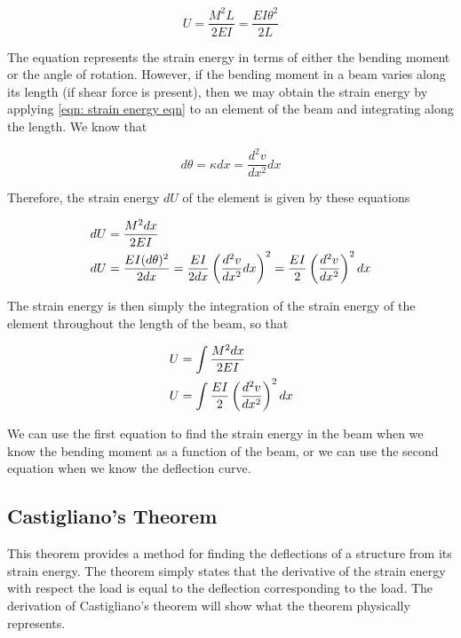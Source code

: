 \documentclass[
10pt,
a4paper,
openany,
svgnames,
]{kaobook} %
\begin{document}
\begin{equation} \label{eqn: strain energy eqn}
  U = \frac{M^2L}{2EI} = \frac{EI\theta ^2}{2L}
\end{equation}

The equation represents the strain energy in terms of either the bending moment or the angle of rotation. However, if the bending moment in a beam varies along its length (if shear force is present), then we may obtain the strain energy by applying \cref{eqn: strain energy eqn} to an element of the beam and integrating along the length. We know that

\[d\theta  = \kappa dx = \frac{{{d^2}v}}{{d{x^2}}}dx\]

Therefore, the strain energy $dU$ of the element is given by these equations

\[\begin{gathered}
  dU = \frac{M^2dx}{2EI} \hfill \\
  dU = \frac{EI(d\theta )^2}{2dx} = \frac{EI}{2dx}\left( \frac{d^2v}{dx^2}dx \right)^2 = \frac{EI}{2}\left( \frac{d^2v}{dx^2} \right)^2dx \hfill \\ 
\end{gathered} \]

The strain energy is then simply the integration of the strain energy of the element throughout the length of the beam, so that

\begin{equation}
  \begin{gathered}
    U = \int \frac{M^2dx}{2EI}  \hfill \\
    U = \int \frac{EI}{2} \left( \frac{d^2v}{dx^2} \right)^2dx  \hfill \\ 
  \end{gathered}
\end{equation}

We can use the first equation to find the strain energy in the beam when we know the bending moment as a function of the beam, or we can use the second equation when we know the deflection curve.

\subsection{Castigliano’s Theorem}

This theorem provides a method for finding the deflections of a structure from its strain energy. The theorem simply states that the derivative of the strain energy with respect the load is equal to the deflection corresponding to the load. The derivation of Castigliano’s theorem will show what the theorem physically represents.
\end{document}

